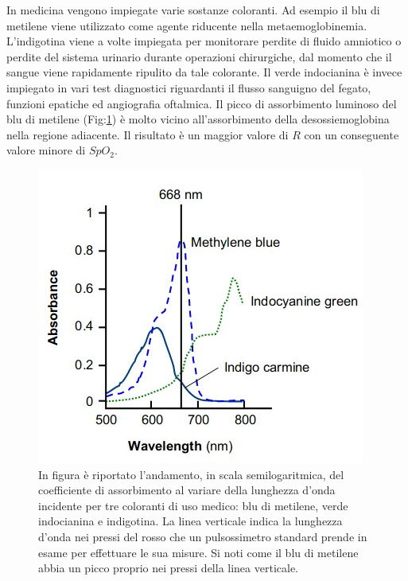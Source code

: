 \documentclass[12pt,a4paper, twoside, openright]{report}
\begin{document}
In medicina vengono impiegate varie sostanze coloranti. 
Ad esempio il blu di metilene viene utilizzato come agente riducente nella metaemoglobinemia. 
L'indigotina viene a volte impiegata per monitorare perdite di fluido amniotico o perdite del sistema urinario durante operazioni chirurgiche, dal momento che il sangue viene rapidamente ripulito da tale colorante. 
Il verde indocianina è invece impiegato in vari test diagnostici riguardanti il flusso sanguigno del fegato, funzioni epatiche ed angiografia oftalmica. 
Il picco di assorbimento luminoso del blu di metilene (Fig:\ref{fig:Coloranti}) è molto vicino all'assorbimento della desossiemoglobina nella regione adiacente. 
Il risultato è un maggior valore di $R$ con un conseguente valore minore di $SpO_2$.
\begin{figure}[h!]
    \centering
    \includegraphics[width=\textwidth]{Coloranti.jpg}
    \caption{In figura è riportato l'andamento, in scala semilogaritmica, del 							 coefficiente di assorbimento al variare della lunghezza d'onda incidente 					 per tre coloranti di uso medico: blu di metilene, verde indocianina e 						 indigotina. 
    		 La linea verticale indica la lunghezza d'onda nei pressi del rosso che un 					 pulsossimetro standard prende in esame per effettuare le sua misure. 
    		 Si noti come il blu di metilene abbia un picco proprio nei pressi della 					 linea verticale.}
    \label{fig:Coloranti}
\end{figure}
\end{document}
